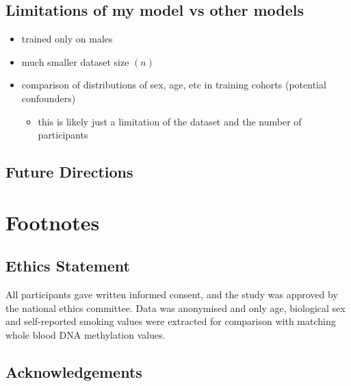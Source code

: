 \documentclass{article}
\begin{document}
\subsection*{Limitations of my model vs other models}
\begin{itemize}
    \item trained only on males
    \item much smaller dataset size \((n)\)
    \item comparison of distributions of sex, age, etc in training cohorts (potential confounders)
          \begin{itemize}
              \item this is likely just a limitation of the dataset and the number of participants
          \end{itemize}
\end{itemize}

\subsection*{Future Directions}

\section{Footnotes}

\subsection{Ethics Statement}
All participants gave written informed consent, and the study was approved by the national ethics committee. Data was anonymised and only age, biological sex and self-reported smoking values were extracted for comparison with matching whole blood DNA methylation values.

\subsection{Acknowledgements}

\printbibliography
\end{document}
